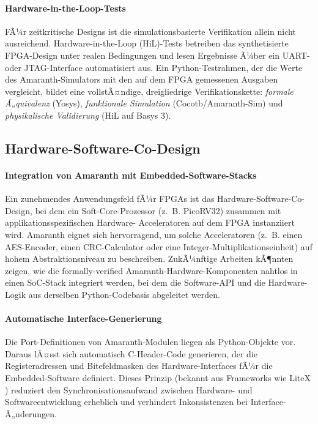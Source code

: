 ﻿\documentclass[12pt,a4paper]{report}
\begin{document}
\paragraph{Hardware-in-the-Loop-Tests}
FÃ¼r zeitkritische Designs ist die simulationsbasierte Verifikation allein nicht
ausreichend. Hardware-in-the-Loop (HiL)-Tests betreiben das synthetisierte FPGA-Design
unter realen Bedingungen und lesen Ergebnisse Ã¼ber ein UART- oder JTAG-Interface
automatisiert aus. Ein Python-Testrahmen, der die Werte des Amaranth-Simulators mit
den auf dem FPGA gemessenen Ausgaben vergleicht, bildet eine vollstÃ¤ndige, dreigliedrige
Verifikationskette: \textit{formale Ã„quivalenz} (Yosys), \textit{funktionale Simulation}
(Cocotb/Amaranth-Sim) und \textit{physikalische Validierung} (HiL auf Basys 3).

\subsection{Hardware-Software-Co-Design}

\paragraph{Integration von Amaranth mit Embedded-Software-Stacks}
Ein zunehmendes Anwendungsfeld fÃ¼r FPGAs ist das Hardware-Software-Co-Design, bei dem ein
Soft-Core-Prozessor (z.~B. PicoRV32) zusammen mit applikationsspezifischen Hardware-
Acceleratoren auf dem FPGA instanziiert wird. Amaranth eignet sich hervorragend, um
solche Acceleratoren (z.~B. einen AES-Encoder, einen CRC-Calculator oder eine
Integer-Multiplikationseinheit) auf hohem Abstraktionsniveau zu beschreiben. ZukÃ¼nftige
Arbeiten kÃ¶nnten zeigen, wie die formally-verified Amaranth-Hardware-Komponenten nahtlos
in einen SoC-Stack integriert werden, bei dem die Software-API und die Hardware-Logik
aus derselben Python-Codebasis abgeleitet werden.

\paragraph{Automatische Interface-Generierung}
Die Port-Definitionen von Amaranth-Modulen liegen als Python-Objekte vor. Daraus lÃ¤sst
sich automatisch C-Header-Code generieren, der die Registeradressen und Bitefeldmasken
des Hardware-Interfaces fÃ¼r die Embedded-Software definiert. Dieses Prinzip (bekannt aus
Frameworks wie LiteX \cite{litex2024}) reduziert den Synchronisationsaufwand zwischen
Hardware- und Softwareentwicklung erheblich und verhindert Inkonsistenzen bei
Interface-Ã„nderungen.
\end{document}
